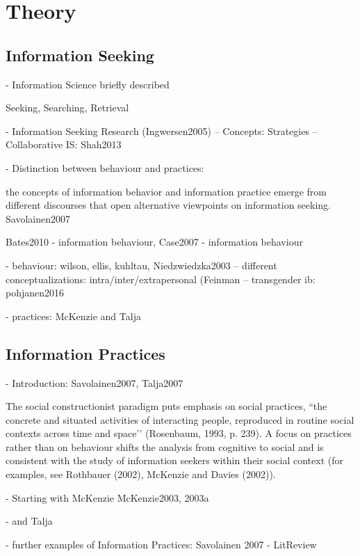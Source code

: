 \documentclass[12pt, a4paper, titlepage, oneside, abstract=true, toc=listof, toc=bibliography]{scrreprt}
\begin{document}
\chapter{Theory}

\section{Information Seeking}
- Information Science briefly described

	Seeking, Searching, Retrieval

- Information Seeking Research (Ingwersen2005)
-- Concepts: Strategies
-- Collaborative IS: Shah2013 

- Distinction between behaviour and practices: 

	the concepts of information behavior and information practice emerge from different discourses that open alternative viewpoints on information seeking. Savolainen2007 

	Bates2010 - information behaviour, Case2007 - information behaviour

- behaviour: wilson, ellis, kuhltau, Niedzwiedzka2003
-- different conceptualizations: intra/inter/extrapersonal (Feinman
-- transgender ib: pohjanen2016

- practices: McKenzie and Talja 

\section{Information Practices}
- Introduction:
	Savolainen2007, Talja2007

The social constructionist paradigm puts emphasis on social practices, ``the concrete and situated activities of interacting people, reproduced in routine social contexts across time and space’’ (Rosenbaum, 1993, p. 239). A focus on
practices rather than on behaviour shifts the analysis from cognitive to social and is consistent with the study of information seekers within their social context (for examples, see Rothbauer (2002), McKenzie and Davies (2002)).

- Starting with McKenzie
	McKenzie2003, 2003a

- and Talja

- further examples of Information Practices: Savolainen 2007 - LitReview
\end{document}

